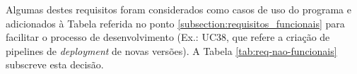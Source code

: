 Algumas destes requisitos foram considerados como casos de uso do programa e adicionados à Tabela referida no ponto \ref{subsection:requisitos_funcionais} para facilitar o processo de desenvolvimento (Ex.: UC38, que refere a criação de pipelines de \textit{deployment} de novas versões). A Tabela \ref{tab:req-nao-funcionais} subscreve esta decisão.







